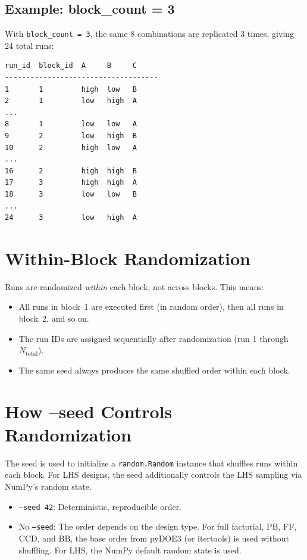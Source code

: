 \documentclass[11pt]{book}
\begin{document}
\subsection{Example: block\_count = 3}

With \texttt{block\_count = 3}, the same 8 combinations are replicated 3 times, giving 24 total runs:

\begin{lstlisting}[language=bash]
run_id  block_id  A     B     C
------------------------------------
1       1         high  low   B
2       1         low   high  A
...
8       1         low   low   A
9       2         low   high  B
10      2         high  low   A
...
16      2         high  high  B
17      3         high  high  A
18      3         low   low   B
...
24      3         low   high  A
\end{lstlisting}

\section{Within-Block Randomization}

Runs are randomized \emph{within} each block, not across blocks. This means:

\begin{itemize}
  \item All runs in block~1 are executed first (in random order), then all runs in block~2, and so on.
  \item The run IDs are assigned sequentially after randomization (run 1 through $N_{\text{total}}$).
  \item The same seed always produces the same shuffled order within each block.
\end{itemize}

\section{How --seed Controls Randomization}

The seed is used to initialize a \texttt{random.Random} instance that shuffles runs within each block. For LHS designs, the seed additionally controls the LHS sampling via NumPy's random state.

\begin{itemize}
  \item \texttt{--seed 42}: Deterministic, reproducible order.
  \item No \texttt{--seed}: The order depends on the design type. For full factorial, PB, FF, CCD, and BB, the base order from pyDOE3 (or itertools) is used without shuffling. For LHS, the NumPy default random state is used.
\end{itemize}
\end{document}
